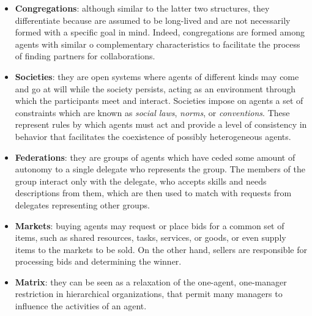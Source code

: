 \begin{itemize}
    \item \textbf{Congregations}: although similar to the latter two structures, they differentiate because are assumed to be long-lived and are not necessarily formed with a specific goal in mind.
    Indeed, congregations are formed among agents with similar o complementary characteristics to facilitate the process of finding partners for collaborations.
    \item \textbf{Societies}: they are open systems where agents of different kinds may come and go at will while the society persists, acting as an environment through which the participants meet and interact.
    Societies impose on agents a set of constraints which are known as \textit{social laws}, \textit{norms}, or \textit{conventions}.
    These represent rules by which agents must act and provide a level of consistency in behavior that facilitates the coexistence of possibly heterogeneous agents.
    \item \textbf{Federations}: they are groups of agents which have ceded some amount of autonomy to a single delegate who represents the group.
    The members of the group interact only with the delegate, who accepts skills and needs descriptions from them, which are then used to match with requests from delegates representing other groups.
    \item \textbf{Markets}: buying agents may request or place bids for a common set of items, such as shared resources, tasks, services, or goods, or even supply items to the markets to be sold.
    On the other hand, sellers are responsible for processing bids and determining the winner.
    \item \textbf{Matrix}: they can be seen as a relaxation of the one-agent, one-manager restriction in hierarchical organizations, that permit many managers to influence the activities of an agent.
\end{itemize}

